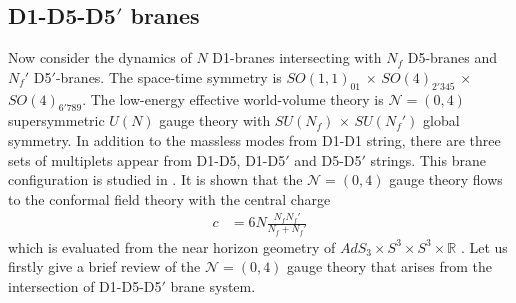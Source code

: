 \documentclass{article}
\numberwithin{equation}{section}
\begin{document}
\subsection{D1-D5-D5$'$ branes}
\label{sec_d1d5d5'}
Now consider the dynamics of $N$ D1-branes intersecting with $N_{f}$ D5-branes and $N_{f}'$ D5$'$-branes. 
The space-time symmetry is $SO(1,1)_{01}$ $\times$ $SO(4)_{2'345}$ $\times$ $SO(4)_{6'789}$. 
The low-energy effective world-volume theory is 
$\mathcal{N}=(0,4)$ supersymmetric $U(N)$ gauge theory with $SU(N_{f})$ $\times$ $SU(N_{f}')$ global symmetry. 
In addition to the massless modes from D1-D1 string, 
there are three sets of multiplets appear from D1-D5, D1-D5$'$ and D5-D5$'$ strings. 
This brane configuration is studied in \cite{Tong:2014yna}. 
It is shown that the $\mathcal{N}=(0,4)$ gauge theory flows to the conformal field theory with the central charge 
\begin{align}
\label{d1d5d5_cc}
c&=6N\frac{N_{f}N_{f}'}{N_{f}+N_{f}'}
\end{align}
which is evaluated from the near horizon geometry \cite{Gukov:2004ym} of 
$ AdS_{3}\times S^{3}\times S^{3}\times \mathbb{R}$ \cite{Cowdall:1998bu, Boonstra:1998yu, Gauntlett:1998kc}. 
Let us firstly give a brief review of the $\mathcal{N}=(0,4)$ gauge theory 
that arises from the intersection of D1-D5-D5$'$ brane system. 
\end{document}
